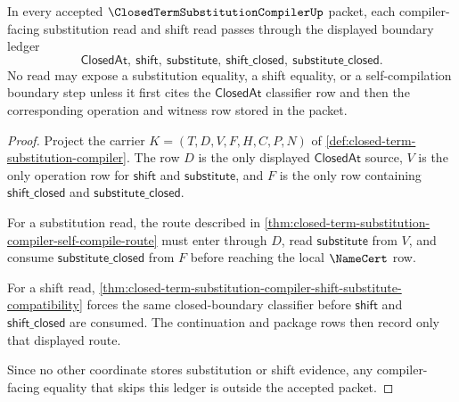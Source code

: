 \begin{theorem}
\label{thm:closed-term-substitution-compiler-boundary-ledger-exactness}
In every accepted $\ClosedTermSubstitutionCompilerUp$ packet, each compiler-facing substitution read and shift read passes through the displayed boundary ledger
$$
\mathsf{ClosedAt},\ \mathsf{shift},\ \mathsf{substitute},\ \mathsf{shift\_closed},\ \mathsf{substitute\_closed}.
$$
No read may expose a substitution equality, a shift equality, or a self-compilation boundary step unless it first cites the $\mathsf{ClosedAt}$ classifier row and then the corresponding operation and witness row stored in the packet.
\end{theorem}
\begin{proof}
Project the carrier $K=(T,D,V,F,H,C,P,N)$ of \autoref{def:closed-term-substitution-compiler}. The row $D$ is the only displayed $\mathsf{ClosedAt}$ source, $V$ is the only operation row for $\mathsf{shift}$ and $\mathsf{substitute}$, and $F$ is the only row containing $\mathsf{shift\_closed}$ and $\mathsf{substitute\_closed}$.

For a substitution read, the route described in \autoref{thm:closed-term-substitution-compiler-self-compile-route} must enter through $D$, read $\mathsf{substitute}$ from $V$, and consume $\mathsf{substitute\_closed}$ from $F$ before reaching the local $\NameCert$ row.

For a shift read, \autoref{thm:closed-term-substitution-compiler-shift-substitute-compatibility} forces the same closed-boundary classifier before $\mathsf{shift}$ and $\mathsf{shift\_closed}$ are consumed. The continuation and package rows then record only that displayed route.

Since no other coordinate stores substitution or shift evidence, any compiler-facing equality that skips this ledger is outside the accepted packet.
\end{proof}

